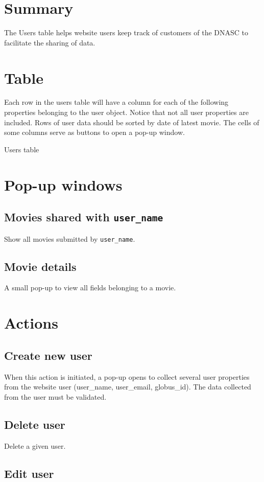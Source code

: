 \section{Summary}

The Users table helps website users keep track of customers of the DNASC to 
facilitate the sharing of data.

\section{Table}

Each row in the users table will have a column for each of the following 
properties belonging to the user object. Notice that not all user properties 
are included. Rows of user data should be sorted by date of latest movie. 
The cells of some columns serve as buttons to open a pop-up window.

\begin{table}[h]
    \caption{Users table}
\end{table}

\section{Pop-up windows}

\subsection{Movies shared with \texttt{user\_name}}

Show all movies submitted by \texttt{user\_name}.

\subsection{Movie details}

A small pop-up to view all fields belonging to a movie.

\section{Actions}

\subsection{Create new user}

When this action is initiated, a pop-up opens to collect several user 
properties from the website user (user\_name, user\_email, globus\_id). 
The data collected from the user must be validated. 

\subsection{Delete user}

Delete a given user.

\subsection{Edit user}

